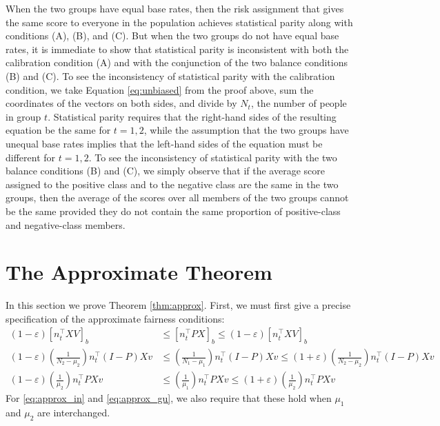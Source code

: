 \documentclass[11pt]{article}
\def\tran{^{\top}}
\newcommand{\p}[1]{\left(#1\right)}
\begin{document}
When the two groups have equal base rates, then the risk assignment that
gives the same score to everyone in the population achieves statistical
parity along with conditions (A), (B), and (C).
But when the two groups do not have equal base rates, 
it is immediate to show that statistical parity is
inconsistent with both the calibration condition (A) and
with the conjunction of the two balance conditions (B) and (C).
To see the inconsistency of statistical parity with the
calibration condition, we take Equation 
\eqref{eq:unbiased} from the proof above,
sum the coordinates of the vectors on both sides, and
divide by $N_t$, the number of people in group $t$.
Statistical parity requires that the right-hand sides of the resulting
equation be the same for $t = 1, 2$, while the assumption that
the two groups have unequal base rates implies that the left-hand sides
of the equation must be different for $t = 1, 2$.
To see the inconsistency of statistical parity with the
two balance conditions (B) and (C), we simply observe that if
the average score assigned to the positive class and to the negative
class are the same in the two groups, then the average of the scores
over all members of the two groups cannot be the same provided they
do not contain the same proportion of positive-class and negative-class
members.

\section{The Approximate Theorem}


In this section we prove Theorem \ref{thm:approx}.
First, we must first give a precise specification
of the approximate fairness conditions:
\begin{align*}
  (1-\varepsilon) [n_t\tran XV]_b &\le [n_t\tran PX]_b \le (1-\varepsilon)
  [n_t\tran XV]_b \tag{A'} \label{eq:approx_su} \\
  (1-\varepsilon) \p{\frac{1}{N_2-\mu_2}} n_t\tran (I-P) Xv &\le
  \p{\frac{1}{N_1-\mu_1}} n_t\tran (I-P)Xv \le (1+\varepsilon)
  \p{\frac{1}{N_2-\mu_2}} n_t\tran (I-P) Xv \tag{B'} \label{eq:approx_in} \\
  (1-\varepsilon) \p{\frac{1}{\mu_2}} n_t\tran P Xv &\le
  \p{\frac{1}{\mu_1}} n_t\tran PXv \le (1+\varepsilon)
  \p{\frac{1}{\mu_2}} n_t\tran P Xv \tag{C'} \label{eq:approx_gu}
\end{align*}
For \eqref{eq:approx_in} and \eqref{eq:approx_gu}, we also require that these
hold when $\mu_1$ and $\mu_2$ are interchanged.
\end{document}
